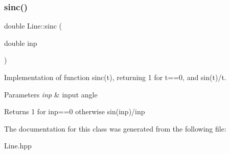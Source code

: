 \subsubsection{\texorpdfstring{sinc()}{sinc()}}
{\footnotesize\ttfamily double Line\+::sinc (\begin{DoxyParamCaption}\item[{double}]{inp }\end{DoxyParamCaption})}



Implementation of function sinc(t), returning 1 for t==0, and sin(t)/t. 


\begin{DoxyParams}{Parameters}
{\em inp} & input angle \\
\hline
\end{DoxyParams}
\begin{DoxyReturn}{Returns}
1 for inp==0 otherwise sin(inp)/inp 
\end{DoxyReturn}


The documentation for this class was generated from the following file\+:\begin{DoxyCompactItemize}
\item 
Line.\+hpp\end{DoxyCompactItemize}
